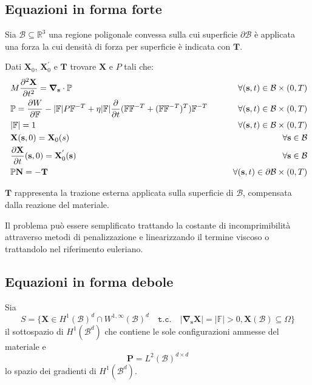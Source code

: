 \subsection{Equazioni in forma forte}

Sia $\mathcal{B} \subseteq \mathbb{R}^3$ una regione poligonale convessa sulla cui superficie $\partial\mathcal{B}$ è applicata una forza la cui densità di forza per superficie è indicata con $\mathbf{T}$.

Dati $\mathbf{X}_0$, $\mathbf{X}^{'}_0$ e $\mathbf{T}$ trovare $\mathbf{X}$ e $P$ tali che:
\begin{align*}
&M\frac{\partial^2\mathbf{X}}{\partial t^2} = \boldsymbol{\nabla}_\mathbf{s} \cdot \mathbb{P} &\qquad \forall(\mathbf{s},t)\in\mathcal{B}\times(0,T)\\
&\mathbb{P} = \frac{\partial W}{\partial\mathbb{F}} - \vert\mathbb{F}\vert P\mathbb{F}^{-T} + \eta\vert\mathbb{F}\vert \frac{\partial}{\partial t}(\mathbb{F}\mathbb{F}^{-T} + (\mathbb{F}\mathbb{F}^{-T})^T)\mathbb{F}^{-T}&\qquad \forall(\mathbf{s},t)\in\mathcal{B}\times(0,T)\\\
&\vert\mathbb{F}\vert =1&\qquad \forall(\mathbf{s},t)\in\mathcal{B}\times(0,T)\\\
&\mathbf{X}(\mathbf{s},0)=\mathbf{X}_0(s)&\qquad \forall\mathbf{s}\in\mathcal{B}\\\
&\frac{\partial \mathbf{X}}{\partial t}(\mathbf{s},0)=\mathbf{X}^{'}_0(\mathbf{s})&\qquad \forall\mathbf{s}\in\mathcal{B}\\
&\mathbb{P}\mathbf{N}=-\mathbf{T}&\qquad \forall(\mathbf{s},t)\in\partial\mathcal{B}\times(0,T)
\end{align*}

$\mathbf{T}$ rappresenta la trazione esterna applicata sulla superficie di $\mathcal{B}$, compensata dalla reazione del materiale.

Il problema può essere semplificato trattando la costante di incomprimibilità attraverso metodi di penalizzazione e linearizzando il termine viscoso o trattandolo nel riferimento euleriano.

\subsection{Equazioni in forma debole}

Sia
\begin{equation*}
S = \{ \mathbf{X} \in H^1(\mathcal{B})^d \cap W^{1,\infty}(\mathcal{B})^d \quad \texttt{t.c.} \quad \vert \boldsymbol {\nabla}_{\mathbf{s}}\mathbf{X}\vert = \vert \mathbb{F} \vert > 0, \mathbf{X}(\mathcal{B}) \subseteq \Omega \}
\end{equation*}
il sottospazio di $H^1(\mathcal{B}^d)$ che contiene le sole configurazioni ammesse del materiale e
\begin{equation*}
\mathbf{P} = L^2(\mathcal{B})^{d\times d}
\end{equation*}
lo spazio dei gradienti di $H^1(\mathcal{B}^d)$.

